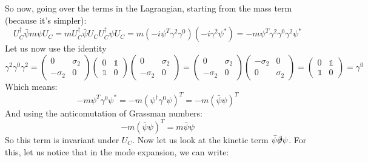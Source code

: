 \documentclass{article}
\begin{document}
So now, going over the terms in the Lagrangian, starting from the mass term (because it's simpler):
\begin{equation}
    U_C^\dagger \bar{\psi}m\psi U_C = 
    m U_C^\dagger \bar{\psi}U_C U_C^\dagger \psi U_C = 
    m (-i\psi^T \gamma^2\gamma^0) (-i\gamma^2\psi^*) =
    -m\psi^T \gamma^2\gamma^0\gamma^2\psi^*
\end{equation}
Let us now use the identity
\begin{equation}
    \gamma^2 \gamma^0 \gamma^2 =
    \begin{pmatrix} 0 & \sigma_2 \\ -\sigma_2 & 0 \end{pmatrix}
    \begin{pmatrix} 0 & \mathbb{1} \\ \mathbb{1} & 0 \end{pmatrix}
    \begin{pmatrix} 0 & \sigma_2 \\ -\sigma_2 & 0 \end{pmatrix} = 
    \begin{pmatrix} 0 & \sigma_2 \\ -\sigma_2 & 0 \end{pmatrix}
    \begin{pmatrix} -\sigma_2 & 0 \\ 0 & \sigma_2 \end{pmatrix} =
    \begin{pmatrix} 0 & \mathbb{1} \\ \mathbb{1} & 0 \end{pmatrix} = \gamma^0
\end{equation}
Which means:
\begin{equation}
    -m\psi^T \gamma^0\psi^* = -m\left(\psi^\dagger\gamma^0\psi\right)^T = -m(\bar{\psi}\psi)^T
\end{equation}
And using the anticomutation of Grassman numbers:
\begin{equation}
    -m(\bar{\psi}\psi)^T = m\bar{\psi}\psi
\end{equation}
So this term is invariant under $U_C$. Now let us look at the kinetic term $\bar{\psi}\slashed{\partial}\psi$. For this, let us notice that in the mode expansion, we can write:
\end{document}
